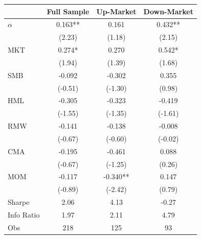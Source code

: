 \begin{tabular}{lccc}
\toprule
 & Full Sample & Up-Market & Down-Market \\
\midrule
$\alpha$ & 0.163** & 0.161 & 0.432** \\
 & (2.23) & (1.18) & (2.15) \\
MKT & 0.274* & 0.270 & 0.542* \\
 & (1.94) & (1.39) & (1.68) \\
SMB & -0.092 & -0.302 & 0.355 \\
 & (-0.51) & (-1.30) & (0.98) \\
HML & -0.305 & -0.323 & -0.419 \\
 & (-1.55) & (-1.35) & (-1.61) \\
RMW & -0.141 & -0.138 & -0.008 \\
 & (-0.67) & (-0.60) & (-0.02) \\
CMA & -0.195 & -0.461 & 0.088 \\
 & (-0.67) & (-1.25) & (0.26) \\
MOM & -0.117 & -0.340** & 0.147 \\
 & (-0.89) & (-2.42) & (0.79) \\
\midrule
Sharpe & 2.06 & 4.13 & -0.27 \\
Info Ratio & 1.97 & 2.11 & 4.79 \\
Obs & 218 & 125 & 93 \\
\bottomrule
\end{tabular}